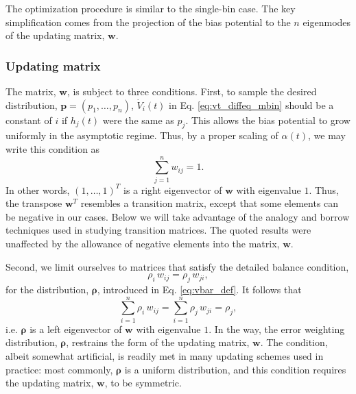 \documentclass[reprint, superscriptaddress, floatfix]{revtex4-1}
\begin{document}
The optimization procedure is similar to the single-bin case.
%
The key simplification comes from the
projection of the bias potential to the $n$ eigenmodes
of the updating matrix, $\mathbf w$.



\subsubsection{\label{sec:updating-matrix}
Updating matrix}



The matrix, $\mathbf w$, is subject to three conditions.
%
First, to sample
the desired distribution,
$\mathbf p = (p_1, \dots, p_n)$,
${\dot V}_i(t)$
in Eq. \eqref{eq:vt_diffeq_mbin}
should be a constant of $i$
if $h_j(t)$ were the same as $p_j$.
%
This allows the bias potential to grow uniformly
in the asymptotic regime.
%
Thus, by a proper scaling of $\alpha(t)$,
we may write this condition as
%
\begin{equation}
  \sum_{j = 1}^n w_{ij} = 1
  .
\label{eq:w_sumj}
\end{equation}
%
In other words, $(1, \dots, 1)^T$
is a right eigenvector of $\mathbf w$
with eigenvalue $1$.
%
Thus, the transpose $\mathbf w^T$
resembles a transition matrix,
except that some elements can be negative
in our cases.
%
Below we will take advantage of the analogy
and borrow techniques used
in studying transition matrices\cite{vankampen}.
%
The quoted results were unaffected by the allowance
of negative elements into the matrix, $\mathbf w$.


Second, we limit ourselves to matrices %
that satisfy
the detailed balance condition,
%
\begin{equation}
  \rho_i \, w_{ij} = \rho_j \, w_{ji}
  ,
  \label{eq:w_detailedbalance}
\end{equation}
%
for the distribution, $\pmb \rho$,
introduced in Eq. \eqref{eq:vbar_def}.
%
It follows that
%
\begin{equation}
  \sum_{i = 1}^n \rho_i \, w_{ij}
  =
  \sum_{i = 1}^n \rho_j \, w_{ji}
  =
  \rho_j,
  \label{eq:w_balance}
\end{equation}
%
i.e. $\pmb \rho$ is a left eigenvector of
$\mathbf w$ with eigenvalue $1$.
%
In the way,
the error weighting distribution, $\pmb \rho$,
restrains the form of the updating matrix, $\mathbf w$.
%
The condition, albeit somewhat artificial,
is readily met in many updating schemes used in practice:
most commonly, $\pmb \rho$ is a uniform distribution,
and this condition requires the updating matrix, $\pmb w$, to be symmetric.
\end{document}
